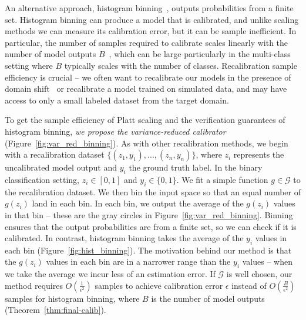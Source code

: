 An alternative approach, histogram binning~\cite{zadrozny2001calibrated}, outputs probabilities from a finite set.
Histogram binning can produce a model that is calibrated, and unlike scaling methods we can measure its calibration error, but it can be sample inefficient.
In particular, the number of samples required to calibrate scales linearly with the number of model outputs $B$~\cite{naeini2014binary}, which can be large particularly in the multi-class setting where $B$ typically scales with the number of classes.
Recalibration sample efficiency is crucial -- we often want to recalibrate our models in the presence of domain shift~\cite{hendrycks2019anomaly} or recalibrate a model trained on simulated data, and may have access to only a small labeled dataset from the target domain.

To get the sample efficiency of Platt scaling and the verification guarantees of histogram binning, \emph{we propose the variance-reduced calibrator} (Figure~\ref{fig:var_red_binning}).
As with other recalibration methods, we begin with a recalibration dataset $\{(z_1, y_1), ..., (z_n, y_n)\}$, where $z_i$ represents the uncalibrated model output and $y_i$ the ground truth label.
In the binary classification setting, $z_i \in [0, 1]$ and $y_i \in \{0, 1\}$.
We fit a simple function $g \in \mathcal{G}$ to the recalibration dataset.
We then bin the input space so that an equal number of $g(z_i)$ land in each bin.
In each bin, we output the average of the $g(z_i)$ values in that bin -- these are the gray circles in Figure~\ref{fig:var_red_binning}.
Binning ensures that the output probabilities are from a finite set, so we can check if it is calibrated.
In contrast, histogram binning takes the average of the $y_i$ values in each bin (Figure~\ref{fig:hist_binning}).
The motivation behind our method is that the $g(z_i)$ values in each bin are in a narrower range than the $y_i$ values -- when we take the average we incur less of an estimation error.
If $\mathcal{G}$ is well chosen, our method requires $O(\frac{1}{\epsilon^2})$ samples to achieve calibration error $\epsilon$ instead of $O(\frac{B}{\epsilon^2})$ samples for histogram binning, where $B$ is the number of model outputs (Theorem~\ref{thm:final-calib}).

